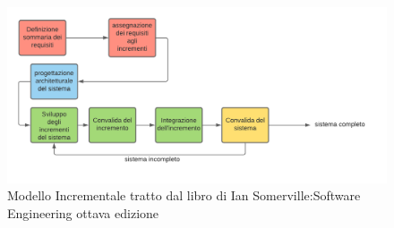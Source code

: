 \begin{figure}[h!]
    \includegraphics[width=1\textwidth]{./src/ModelloSviluppo/src/img/diagramma modello di sviluppo.png}
    \caption{Modello Incrementale tratto dal libro di Ian Somerville:Software Engineering ottava edizione}
\end{figure}
